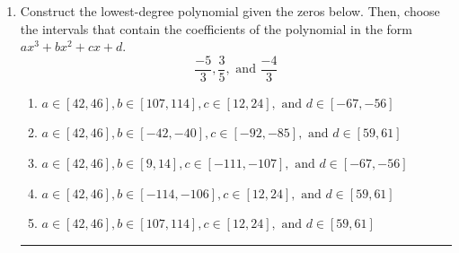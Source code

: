 \documentclass[14pt]{extbook}
\newcommand{\litem}[1]{\item#1\hspace*{-1cm}\rule{\textwidth}{0.4pt}}
\begin{document}
\begin{enumerate}
{\begin{enumerate}[label=\Alph*.]
\end{enumerate} }
\litem{
Construct the lowest-degree polynomial given the zeros below. Then, choose the intervals that contain the coefficients of the polynomial in the form $ax^3+bx^2+cx+d$.\[ \frac{-5}{3}, \frac{3}{5}, \text{ and } \frac{-4}{3} \]\begin{enumerate}[label=\Alph*.]
\item \( a \in [42, 46], b \in [107, 114], c \in [12, 24], \text{ and } d \in [-67, -56] \)
\item \( a \in [42, 46], b \in [-42, -40], c \in [-92, -85], \text{ and } d \in [59, 61] \)
\item \( a \in [42, 46], b \in [9, 14], c \in [-111, -107], \text{ and } d \in [-67, -56] \)
\item \( a \in [42, 46], b \in [-114, -106], c \in [12, 24], \text{ and } d \in [59, 61] \)
\item \( a \in [42, 46], b \in [107, 114], c \in [12, 24], \text{ and } d \in [59, 61] \)


\end{enumerate}}
\end{enumerate}
\end{document}
